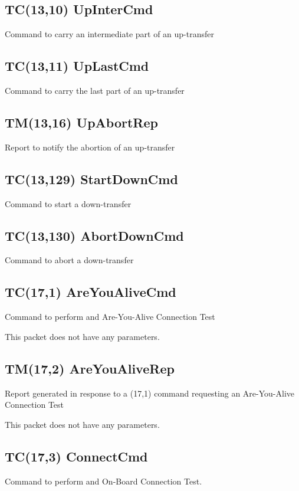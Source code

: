 \pagebreak
\subsection{TC(13,10) UpInterCmd}
Command to carry an intermediate part of an up-transfer

\pagebreak
\subsection{TC(13,11) UpLastCmd}
Command to carry the last part of an up-transfer

\pagebreak
\subsection{TM(13,16) UpAbortRep}
Report to notify the abortion of an up-transfer

\pagebreak
\subsection{TC(13,129) StartDownCmd}
Command to start a down-transfer

\pagebreak
\subsection{TC(13,130) AbortDownCmd}
Command to abort a down-transfer

\pagebreak
\subsection{TC(17,1) AreYouAliveCmd}
Command to perform and Are-You-Alive Connection Test

This packet does not have any parameters.

\pagebreak
\subsection{TM(17,2) AreYouAliveRep}
Report generated in response to a (17,1) command requesting an Are-You-Alive Connection Test

This packet does not have any parameters.

\pagebreak
\subsection{TC(17,3) ConnectCmd}
Command to perform and On-Board Connection Test. 


